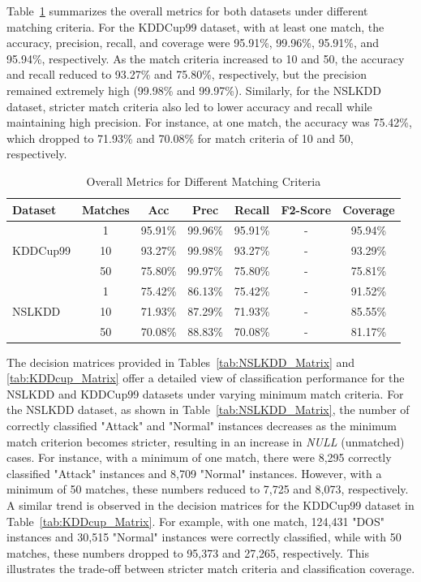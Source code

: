 \documentclass[pdflatex,sn-mathphys-num]{sn-jnl}%
\let\oldcaption\caption
\renewcommand{\caption}[1]{\oldcaption{\centering #1}}
\theoremstyle{thmstyleone}%
\theoremstyle{thmstyletwo}%
\theoremstyle{thmstylethree}%
\begin{document}
Table~\ref{tab:Overall_Metrics} summarizes the overall metrics for both datasets under different matching criteria. 
For the KDDCup99 dataset, with at least one match, the accuracy, precision, recall, and coverage were 95.91\%, 99.96\%, 95.91\%, and 95.94\%, respectively. As the match criteria increased to 10 and 50, the accuracy and recall reduced to 93.27\% and 75.80\%, respectively, but the precision remained extremely high (99.98\% and 99.97\%). Similarly, for the NSLKDD dataset, stricter match criteria also led to lower accuracy and recall while maintaining high precision. For instance, at one match, the accuracy was 75.42\%, which dropped to 71.93\% and 70.08\% for match criteria of 10 and 50, respectively.

\begin{table}[ht!]
    \centering
    \caption{Overall Metrics for Different Matching Criteria}
    \begin{tabular}{lcccccc}
    \toprule
    \textbf{Dataset} & \textbf{Matches} & \textbf{Acc} & \textbf{Prec} & \textbf{Recall} & \textbf{F2-Score} & \textbf{Coverage} \\
    \midrule
    \multirow{3}{*}{KDDCup99} & 1 & 95.91\% & 99.96\% & 95.91\% & - & 95.94\% \\
    & 10 & 93.27\% & 99.98\% & 93.27\% & - & 93.29\% \\
    & 50 & 75.80\% & 99.97\% & 75.80\% & - & 75.81\% \\
    \midrule
    \multirow{3}{*}{NSLKDD} & 1 & 75.42\% & 86.13\% & 75.42\% & - & 91.52\% \\
    & 10 & 71.93\% & 87.29\% & 71.93\% & - & 85.55\% \\
    & 50 & 70.08\% & 88.83\% & 70.08\% & - & 81.17\%\\
    \bottomrule
    \end{tabular}
    \label{tab:Overall_Metrics}
\end{table}

The decision matrices provided in Tables~\ref{tab:NSLKDD_Matrix} and \ref{tab:KDDcup_Matrix} offer a detailed view of classification performance for the NSLKDD and KDDCup99 datasets under varying minimum match criteria.
For the NSLKDD dataset, as shown in Table~\ref{tab:NSLKDD_Matrix}, the number of correctly classified "Attack" and "Normal" instances decreases as the minimum match criterion becomes stricter, resulting in an increase in \textit{NULL} (unmatched) cases.
For instance, with a minimum of one match, there were 8,295 correctly classified "Attack" instances and 8,709 "Normal" instances. However, with a minimum of 50 matches, these numbers reduced to 7,725 and 8,073, respectively.
A similar trend is observed in the decision matrices for the KDDCup99 dataset in Table~\ref{tab:KDDcup_Matrix}. For example, with one match, 124,431 "DOS" instances and 30,515 "Normal" instances were correctly classified, while with 50 matches, these numbers dropped to 95,373 and 27,265, respectively.
This illustrates the trade-off between stricter match criteria and classification coverage.
\end{document}
